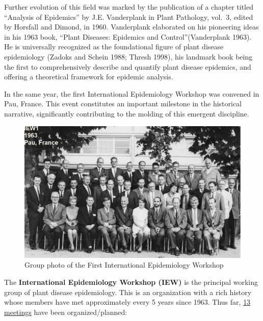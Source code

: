 \documentclass[
  letterpaper,
  DIV=11,
  numbers=noendperiod]{scrreprt}
\begin{document}
Further evolution of this field was marked by the publication of a
chapter titled ``Analysis of Epidemics'' by J.E. Vanderplank in Plant
Pathology, vol.~3, edited by Horsfall and Dimond, in 1960. Vanderplank
elaborated on his pioneering ideas in his 1963 book, ``Plant Diseases:
Epidemics and Control''(Vanderplank 1963). He is universally recognized
as the foundational figure of plant disease epidemiology (Zadoks and
Schein 1988; Thresh 1998), his landmark book being the first to
comprehensively describe and quantify plant disease epidemics, and
offering a theoretical framework for epidemic analysis.

In the same year, the first International Epidemiology Workshop was
convened in Pau, France. This event constitutes an important milestone
in the historical narrative, significantly contributing to the molding
of this emergent discipline.

\begin{figure}

{\centering \includegraphics[width=5.38542in,height=\textheight]{imgs/iew1.png}

}

\caption{\label{fig-iew1}Group photo of the First International
Epidemiology Workshop}

\end{figure}

The \textbf{International Epidemiology Workshop (IEW)} is the principal
working group of plant disease epidemiology. This is an organization
with a rich history whose members have met approximately every 5 years
since 1963. Thus far, \href{https://iew13.net/about.html}{13 meetings}
have been organized/planned:
\end{document}
